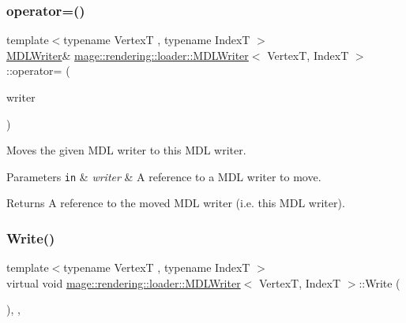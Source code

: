 \subsubsection{\texorpdfstring{operator=()}{operator=()}\hspace{0.1cm}{\footnotesize\ttfamily [2/2]}}
{\footnotesize\ttfamily template$<$typename VertexT , typename IndexT $>$ \\
\hyperlink{classmage_1_1rendering_1_1loader_1_1_m_d_l_writer}{M\+D\+L\+Writer}\& \hyperlink{classmage_1_1rendering_1_1loader_1_1_m_d_l_writer}{mage\+::rendering\+::loader\+::\+M\+D\+L\+Writer}$<$ VertexT, IndexT $>$\+::operator= (\begin{DoxyParamCaption}\item[{\hyperlink{classmage_1_1rendering_1_1loader_1_1_m_d_l_writer}{M\+D\+L\+Writer}$<$ VertexT, IndexT $>$ \&\&}]{writer }\end{DoxyParamCaption})\hspace{0.3cm}{\ttfamily [delete]}}

Moves the given M\+DL writer to this M\+DL writer.


\begin{DoxyParams}[1]{Parameters}
\mbox{\tt in}  & {\em writer} & A reference to a M\+DL writer to move. \\
\hline
\end{DoxyParams}
\begin{DoxyReturn}{Returns}
A reference to the moved M\+DL writer (i.\+e. this M\+DL writer). 
\end{DoxyReturn}
\hypertarget{classmage_1_1rendering_1_1loader_1_1_m_d_l_writer_a1506b1a09c7a7c1ee1e206cc6d5cd0e0}{}\label{classmage_1_1rendering_1_1loader_1_1_m_d_l_writer_a1506b1a09c7a7c1ee1e206cc6d5cd0e0} 
\subsubsection{\texorpdfstring{Write()}{Write()}}
{\footnotesize\ttfamily template$<$typename VertexT , typename IndexT $>$ \\
virtual void \hyperlink{classmage_1_1rendering_1_1loader_1_1_m_d_l_writer}{mage\+::rendering\+::loader\+::\+M\+D\+L\+Writer}$<$ VertexT, IndexT $>$\+::Write (\begin{DoxyParamCaption}{ }\end{DoxyParamCaption})\hspace{0.3cm}{\ttfamily [override]}, {\ttfamily [private]}, {\ttfamily [virtual]}}

